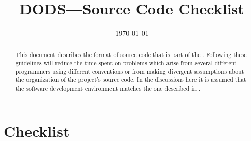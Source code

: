 
%
%






\title{DODS---Source Code Checklist}
\author{}
\date{\today}

\maketitle

\begin{abstract}
  
  This document describes the format of source code that is part of the
  \DODS. Following these guidelines will reduce the time spent on problems
  which arise from several different programmers using different conventions
  or from making divergent assumptions about the organization of the
  project's source code. In the discussions here it is assumed that the
  software development environment matches the one described in \SOFT.

\end{abstract}


\begin{htmlonly}
\end{htmlonly}

\tableofcontents

\newpage

\section{Checklist}
\label{walk:checklist}

